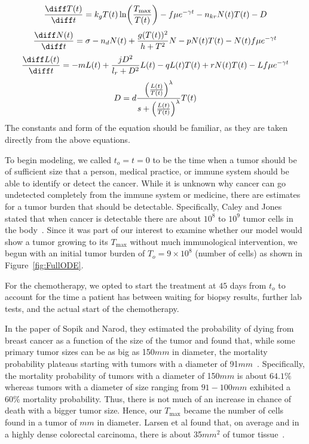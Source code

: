 \documentclass[11pt]{amsart}
\begin{document}
\begin{equation} \label{eq:unifiedmodel}
\frac{\diff T(t)}{\diff t} = k_g T(t) \ln \biggl(\frac{T_{\max}}{T(t)} \biggr) - f \mu e^{-\gamma t} - n_{kr}N(t)T(t) - D 
\end{equation}
\begin{equation} \label{eq: NK}
\frac{\diff N(t)}{\diff t} = \sigma - n_dN(t) +\frac{g(T(t))^2}{h + T^2}N - pN(t)T(t) - N(t)f \mu e^{-\gamma t}
\end{equation}
\begin{equation} \label{eq: CD8}
\frac{\diff L(t)}{\diff t} = - mL(t) +\frac{jD^2}{l_r + D^2}L(t) - qL(t)T(t) + rN(t)T(t) - Lf \mu e^{-\gamma t}
\end{equation}
\begin{equation} \label{eq:Dconst}
D = d\frac{\Bigl(\frac{L(t)}{T(t)}\Bigr)^\lambda}{s + \Bigl(\frac{L(t)}{T(t)}\Bigr)^\lambda}T(t)
\end{equation}
The constants and form of the equation should be familiar, as they are taken directly from the above equations. 


To begin modeling, we called $t_o=t=0$ to be the time when a tumor should be of sufficient size that a person, medical practice, or immune system should be able to identify or detect the cancer.
While it is unknown why cancer can go undetected completely from the immune system or medicine, there are estimates for a tumor burden that should be detectable. 
Specifically, Caley and Jones stated that when cancer is detectable there are about $10^8$ to $10^9$ tumor cells in the body\ \cite{CALEY2012186}. 
Since it was part of our interest to examine whether our model would show a tumor growing to its $T_{\max}$ without much immunological intervention, we begun with an initial tumor burden of $T_o = 9\times10^8$ (number of cells) as shown in  Figure~\ref{fig:FullODE}.

For the chemotherapy, we opted to start the treatment at $45$ days from $t_o$ to account for the time a patient has between waiting for biopsy results, further lab tests, and the actual start of the chemotherapy.

In the paper of Sopik and Narod, they estimated the probability of dying from breast cancer as a function of the size of the tumor and found that, while some primary tumor sizes can be as big as 150$mm$ in diameter, the mortality probability plateaus starting with tumors with a diameter of  91$mm$\ \cite{SopikTumorSize}.
Specifically, the mortality probability of tumors with a  diameter of 150$mm$ is about $64.1\%$ whereas tumors with a diameter of size ranging from $91-100 mm$ exhibited a $60\%$ mortality probability.
Thus, there is not much of an increase in chance of death with a bigger tumor size.
Hence, our $T_{\max}$ became the number of cells found in a tumor of $mm$ in diameter.
Larsen et al found that, on average and in a highly dense colorectal carcinoma, there is about 35$mm^2$  of tumor tissue\ \cite{LarsenStineNkCellsRatio}.
\end{document}
